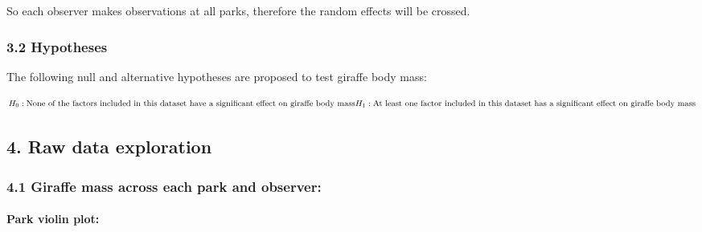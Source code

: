 \documentclass[
]{article}
\begin{document}
So each observer makes observations at all parks, therefore the random
effects will be crossed.

\subsubsection{3.2 Hypotheses}\label{hypotheses}

The following null and alternative hypotheses are proposed to test
giraffe body mass:

\[
H_0: \text{None of the factors included in this dataset have a significant effect on giraffe body mass}\\
H_1: \text{At least one factor included in this dataset has a significant effect on giraffe body mass}
\]

\subsection{4. Raw data exploration}\label{raw-data-exploration}

\subsubsection{4.1 Giraffe mass across each park and
observer:}\label{giraffe-mass-across-each-park-and-observer}

\paragraph{Park violin plot:}\label{park-violin-plot}
\end{document}
